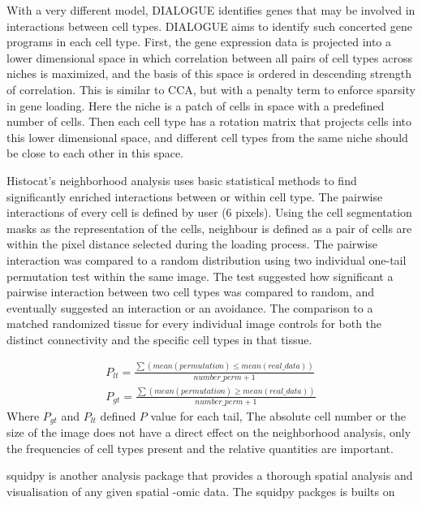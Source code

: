 With a very different model, DIALOGUE identifies genes that may be involved in interactions between cell types. DIALOGUE aims to identify such concerted gene programs in each cell type. First, the gene expression data is projected into a lower dimensional space in which correlation between all pairs of cell types across niches is maximized, and the basis of this space is ordered in descending strength of correlation. This is similar to CCA, but with a penalty term to enforce sparsity in gene loading. Here the niche is a patch of cells in space with a predefined number of cells. Then each cell type has a rotation matrix that projects cells into this lower dimensional space, and different cell types from the same niche should be close to each other in this space.

Histocat's neighborhood analysis uses  basic statistical methods to find significantly enriched interactions between or within cell type. The pairwise interactions of every cell is defined by user (6 pixels). Using the cell segmentation masks as the representation of the cells, neighbour is defined as a pair of cells are within the pixel distance selected during the loading process. The pairwise interaction was compared to a random distribution using two individual one-tail permutation test within the same image. The test suggested how significant a pairwise interaction between two cell types was compared to random, and eventually suggested an interaction or an avoidance. The comparison to a matched randomized tissue for every individual image controls for both the distinct connectivity and the specific cell types in that tissue. 

\begin{equation}
\begin{split}
P_{lt} = \frac{ \sum(mean(permutation) \leq mean(real\_data) )}{number\_perm + 1} \\
P_{gt} = \frac{\sum(mean(permutation) \geq mean(real\_data) )}{number\_perm + 1}
\label{chap1:eq:02}
\end{split}
\end{equation}
Where $P_{gt}$ and $P_{lt}$ defined $P$ value for each tail, 
The absolute cell number or the size of the image does not have a direct effect on the neighborhood analysis, only the frequencies of cell types present and the relative quantities are important. 

squidpy is another analysis package that provides a thorough spatial analysis and visualisation of any given spatial -omic data. The squidpy packges is builts on   


